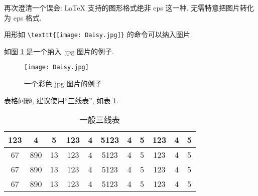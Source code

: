 \documentclass{ice_report}  %
\begin{document}
再次澄清一个误会: \LaTeX{} 支持的图形格式绝非 eps 这一种. 无需特意把图片转化为 eps 格式.

用形如 \verb|\texttt{[image: Daisy.jpg]}| 的命令可以纳入图片.

如图 \ref{fig:1} 是一个纳入~jpg 图片的例子.

\begin{figure}[ht]
\centering
  \texttt{[image: Daisy.jpg]}
  \caption{一个彩色 jpg 图片的例子}
  \label{fig:1}
\end{figure}

表格问题, 建议使用``三线表'', 如表 \ref{tab:1}.

\begin{table}[ht]
\centering
\caption{一般三线表}
\label{tab:1}
    \begin{tabular}{c c c c c c c c c c c}
    \hline
    123 & 4  & 5  & 123 & 4 & 5123 & 4 & 5 & 123 & 4 & 5\\
    \hline
    67 & 890 & 13 & 123 & 4 & 5123 & 4 & 5 & 123 & 4 & 5\\
    67 & 890 & 13 & 123 & 4 & 5123 & 4 & 5 & 123 & 4 & 5\\
    67 & 890 & 13 & 123 & 4 & 5123 & 4 & 5 & 123 & 4 & 5\\
    \hline
    \end{tabular}
\end{table}




\end{document}
